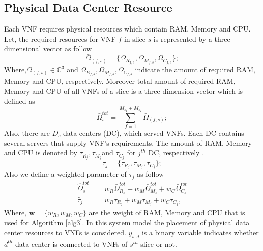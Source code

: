 \documentclass[conference]{IEEEtran}
\begin{document}
\subsection{Physical Data Center Resource}
Each VNF requires
physical resources which contain RAM, Memory and CPU.
Let, the required resources for VNF $f$ in slice $s$ is represented by a three dimensional vector as follow
\begin{equation}
\bar{\Omega}_{(f,s)} = \{\Omega_{R_{f,s}}, \Omega_{M_{f,s}}, \Omega_{C_{f,s}} \};
\end{equation} 
Where,$\bar{\Omega}_{(f,s)}\in \mathbb{C}^{3}$ and $\Omega_{R_{f,s}}, \Omega_{M_{f,s}}, \Omega_{C_{f,s}}$ indicate the amount of required RAM, Memory and CPU, respectively.
Moreover total amount of required RAM, Memory and CPU of all VNFs of a slice is a three dimension vector which is defined as
\begin{equation}
\bar{\Omega}_{s}^{tot} = \sum_{f=1}^{M_{s_1} + M_{s_2}}\bar{\Omega}_{(f,s)};
\end{equation}
Also, there are $D_c$ data centers (DC), which served VNFs. Each DC contains several servers that supply VNF's requirements.
The amount of RAM, Memory and CPU is denoted by $\tau_{R_{j}}, \tau_{M_{j}}$and $\tau_{C_{j}} $ for $j^{th}$ DC, respectively .
\begin{equation*}
\tau_j = \{\tau_{R_{j}}, \tau_{M_{j}}, \tau_{C_{j}} \};
\end{equation*}
Also we define a weighted parameter of $\tau_j$ as follow
\begin{equation}\label{wt}
\begin{split}
\hat{\Omega}_{s}^{tot} &= w_R \bar{\Omega}_{R_s}^{tot} + w_M \bar{\Omega}_{M_s}^{tot} + w_C \bar{\Omega}_{C_s}^{tot} \\
\hat{\tau}_j &= w_R \tau_{R_{j}} + w_M \tau_{M_{j}} + w_C \tau_{C_{j}},
\end{split}
\end{equation}
Where, $\boldsymbol{w} = \{w_R, w_M, w_C\}$ are the weight of RAM, Memory and CPU that is used for Algorithm \ref{alg3}.
In this system model the placement of physical data center resources to VNFs is considered. $y_{s,d}$ is a binary variable indicates whether $d^{th}$ data-center is connected to VNFs of $s^{th}$ slice or not.
\end{document}
